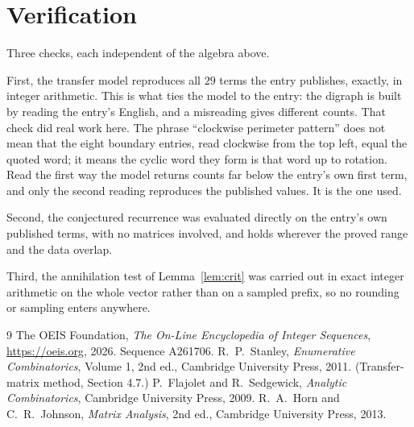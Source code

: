\documentclass[11pt,a4paper]{article}
\theoremstyle{plain}
\theoremstyle{definition}
\begin{document}
\section{Verification}

Three checks, each independent of the algebra above.

First, the transfer model reproduces all $29$ terms the entry publishes, exactly, in
integer arithmetic. This is what ties the model to the entry: the digraph is built by reading
the entry's English, and a misreading gives different counts. That check did real work here. The phrase ``clockwise perimeter pattern'' does not mean that the eight boundary entries, read clockwise from the top left, equal the quoted word; it means the cyclic word they form is that word up to rotation. Read the first way the model returns counts far below the entry's own first term, and only the second reading reproduces the published values. It is the one used.

Second, the conjectured recurrence was evaluated directly on the entry's own published terms,
with no matrices involved, and holds wherever the proved range and the data overlap.

Third, the annihilation test of Lemma~\ref{lem:crit} was carried out in exact integer
arithmetic on the whole vector rather than on a sampled prefix, so no rounding or sampling
enters anywhere.

\begin{thebibliography}{9}
 The OEIS Foundation, \emph{The On-Line Encyclopedia of Integer
Sequences}, \url{https://oeis.org}, 2026. Sequence A261706.
 R.~P.~Stanley, \emph{Enumerative Combinatorics}, Volume 1, 2nd ed.,
Cambridge University Press, 2011. (Transfer-matrix method, Section 4.7.)
 P.~Flajolet and R.~Sedgewick, \emph{Analytic Combinatorics}, Cambridge
University Press, 2009.
 R.~A.~Horn and C.~R.~Johnson, \emph{Matrix Analysis}, 2nd ed., Cambridge
University Press, 2013.
\end{thebibliography}
\end{document}
